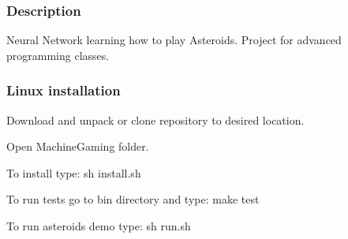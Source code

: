 \subsubsection*{Description}

Neural Network learning how to play Asteroids. Project for advanced programming classes.

\subsubsection*{Linux installation}


\begin{DoxyEnumerate}
\item Download and unpack or clone repository to desired location.
\item Open Machine\+Gaming folder.
\item To install type\+: sh install.\+sh
\item To run tests go to bin directory and type\+: make test
\item To run asteroids demo type\+: sh run.\+sh 
\end{DoxyEnumerate}
